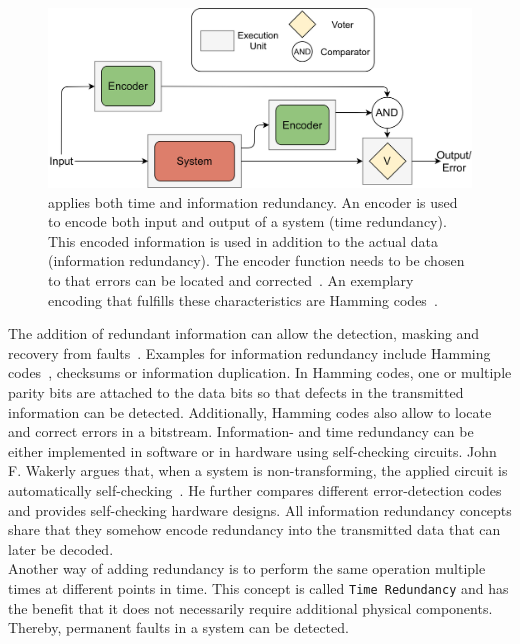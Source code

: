 \begin{figure}[!hb]
	\centering
	\includegraphics[width=0.8\linewidth]{images/ECC}
	\caption{ applies both time and information redundancy. An encoder is used to encode both input and output of a system (time redundancy). This encoded information is used in addition to the actual data (information redundancy). The encoder function needs to be chosen to that errors can be located and corrected~\cite{Su2005ECC}. An exemplary encoding that fulfills these characteristics are Hamming codes~\cite{HammingCodes}.}
	\label{fig:ECC}
\end{figure}

The addition of redundant information can allow the detection, masking and recovery from faults~\cite{BarryFaultToleranceAnalysis}.
Examples for information redundancy include Hamming codes~\cite{HammingCodes}, checksums or information duplication.
In Hamming codes, one or multiple parity bits are attached to the data bits so that defects in the transmitted information can be detected.
Additionally, Hamming codes also allow to locate and correct errors in a bitstream.
Information- and time redundancy can be either implemented in software or in hardware using self-checking circuits.
John F. Wakerly argues that, when a system is non-transforming, the applied circuit is automatically self-checking~\cite{SelfCheckingProcessorDesign}.
He further compares different error-detection codes and provides self-checking hardware designs.
All information redundancy concepts share that they somehow encode redundancy into the transmitted data that can later be decoded.
\\

Another way of adding redundancy is to perform the same operation multiple times at different points in time.
This concept is called \texttt{Time Redundancy} and has the benefit that it does not necessarily require additional physical components.
Thereby, permanent faults in a system can be detected.

